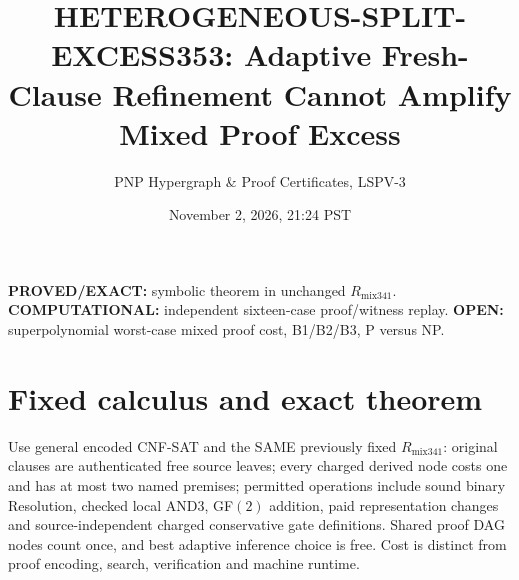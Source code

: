 \documentclass[11pt]{article}
\title{HETEROGENEOUS-SPLIT-EXCESS353: Adaptive Fresh-Clause Refinement Cannot Amplify Mixed Proof Excess}
\author{PNP Hypergraph \& Proof Certificates, LSPV-3}
\date{November 2, 2026, 21:24 PST}
\begin{document}
\maketitle
\noindent\textbf{PROVED/EXACT:} symbolic theorem in unchanged $R_{\mathrm{mix341}}$.
\textbf{COMPUTATIONAL:} independent sixteen-case proof/witness replay.
\textbf{OPEN:} superpolynomial worst-case mixed proof cost, B1/B2/B3, P versus NP.

\section*{Fixed calculus and exact theorem}
Use general encoded CNF-SAT and the SAME previously fixed $R_{\mathrm{mix341}}$: original clauses are authenticated free source leaves; every charged derived node costs one and has at most two named premises; permitted operations include sound binary Resolution, checked local AND3, GF$(2)$ addition, paid representation changes and source-independent charged conservative gate definitions. Shared proof DAG nodes count once, and best adaptive inference choice is free. Cost is distinct from proof encoding, search, verification and machine runtime.
\end{document}

